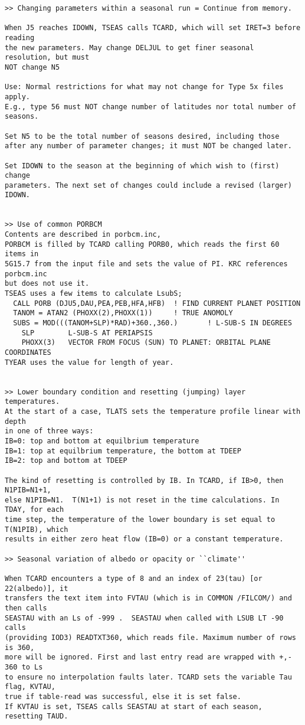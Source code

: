 \begin{verbatim}
>> Changing parameters within a seasonal run = Continue from memory.

When J5 reaches IDOWN, TSEAS calls TCARD, which will set IRET=3 before reading
the new parameters. May change DELJUL to get finer seasonal resolution, but must
NOT change N5

Use: Normal restrictions for what may not change for Type 5x files apply.
E.g., type 56 must NOT change number of latitudes nor total number of seasons.

Set N5 to be the total number of seasons desired, including those
after any number of parameter changes; it must NOT be changed later.

Set IDOWN to the season at the beginning of which wish to (first) change
parameters. The next set of changes could include a revised (larger) IDOWN.


>> Use of common PORBCM
Contents are described in porbcm.inc, 
PORBCM is filled by TCARD calling PORB0, which reads the first 60 items in 
5G15.7 from the input file and sets the value of PI. KRC references porbcm.inc 
but does not use it. 
TSEAS uses a few items to calculate LsubS; 
  CALL PORB (DJU5,DAU,PEA,PEB,HFA,HFB)  ! FIND CURRENT PLANET POSITION 
  TANOM = ATAN2 (PHOXX(2),PHOXX(1))     ! TRUE ANOMOLY
  SUBS = MOD(((TANOM+SLP)*RAD)+360.,360.)       ! L-SUB-S IN DEGREES
    SLP        L-SUB-S AT PERIAPSIS
    PHOXX(3)   VECTOR FROM FOCUS (SUN) TO PLANET: ORBITAL PLANE COORDINATES
TYEAR uses the value for length of year.


>> Lower boundary condition and resetting (jumping) layer temperatures.
At the start of a case, TLATS sets the temperature profile linear with depth
in one of three ways:
IB=0: top and bottom at equilbrium temperature
IB=1: top at equilbrium temperature, the bottom at TDEEP
IB=2: top and bottom at TDEEP

The kind of resetting is controlled by IB. In TCARD, if IB>0, then N1PIB=N1+1,
else N1PIB=N1.  T(N1+1) is not reset in the time calculations. In TDAY, for each
time step, the temperature of the lower boundary is set equal to T(N1PIB), which
results in either zero heat flow (IB=0) or a constant temperature.

>> Seasonal variation of albedo or opacity or ``climate''

When TCARD encounters a type of 8 and an index of 23(tau) [or 22(albedo)], it
transfers the text item into FVTAU (which is in COMMON /FILCOM/) and then calls
SEASTAU with an Ls of -999 .  SEASTAU when called with LSUB LT -90 calls
(providing IOD3) READTXT360, which reads file. Maximum number of rows is 360,
more will be ignored. First and last entry read are wrapped with +,- 360 to Ls
to ensure no interpolation faults later. TCARD sets the variable Tau flag, KVTAU,
true if table-read was successful, else it is set false.
If KVTAU is set, TSEAS calls SEASTAU at start of each season, resetting TAUD. 


\end{verbatim}
